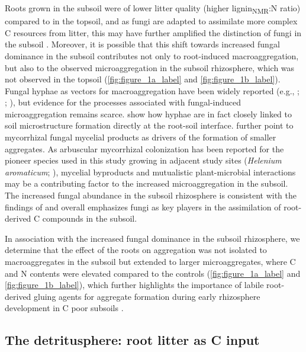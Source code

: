 Roots grown in the subsoil were of lower litter quality (higher lignin\textsubscript{NMR}:N ratio) compared to in the topsoil, and as fungi are adapted to assimilate more complex C resources from litter, this may have further amplified the distinction of fungi in the subsoil \citep{Poll2006}. Moreover, it is possible that this shift towards increased fungal dominance in the subsoil contributes not only to root-induced macroaggregation, but also to the observed microaggregation in the subsoil rhizosphere, which was not observed in the topsoil (\cref{fig:figure_1a_label} and \cref{fig:figure_1b_label}). Fungal hyphae as vectors for macroaggregation have been widely reported (e.g., \citealp{Bossuyt2001}; \citealp{Lehmann2020}; \citealp{Bucka2021}), but evidence for the processes associated with fungal-induced microaggregation remains scarce. \citet{Vidal2018} show how hyphae are in fact closely linked to soil microstructure formation directly at the root-soil interface. \citet{Rillig2006} further point to mycorrhizal fungal mycelial products as drivers of the formation of smaller aggregates. As arbuscular mycorrhizal colonization has been reported for the pioneer species used in this study growing in adjacent study sites (\textit{Helenium aromaticum}; \citealp{Dhillion1995}), mycelial byproducts and mutualistic plant-microbial interactions may be a contributing factor to the increased microaggregation in the subsoil. The increased fungal abundance in the subsoil rhizosphere is consistent with the findings of \citet{Baumert2021} and overall emphasizes fungi as key players in the assimilation of root-derived C compounds in the subsoil.

In association with the increased fungal dominance in the subsoil rhizosphere, we determine that the effect of the roots on aggregation was not isolated to macroaggregates in the subsoil but extended to larger microaggregates, where C and N contents were elevated compared to the controls (\cref{fig:figure_1a_label} and \cref{fig:figure_1b_label}), which further highlights the importance of labile root-derived gluing agents for aggregate formation during early rhizosphere development in C poor subsoils \citep{Baumert2018}.

\subsection{The detritusphere: root litter as C input}

